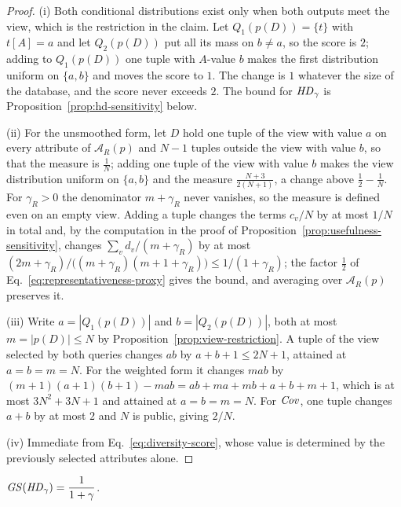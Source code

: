 \begin{proof}
(i) Both conditional distributions exist only when both outputs meet the view, which is the restriction in the claim.
Let $Q_1(p(D))=\{t\}$ with $t[A]=a$ and let $Q_2(p(D))$ put all its mass on $b\neq a$, so the score is $2$; adding to $Q_1(p(D))$ one tuple with $A$-value $b$ makes the first distribution uniform on $\{a,b\}$ and moves the score to $1$.
The change is $1$ whatever the size of the database, and the score never exceeds $2$.
The bound for $\mathit{HD}_\gamma$ is Proposition~\ref{prop:hd-sensitivity} below.

(ii) For the unsmoothed form, let $D$ hold one tuple of the view with value $a$ on every attribute of $\mathcal{A}_R(p)$ and $N-1$ tuples outside the view with value $b$, so that the measure is $\tfrac1N$; adding one tuple of the view with value $b$ makes the view distribution uniform on $\{a,b\}$ and the measure $\tfrac{N+3}{2(N+1)}$, a change above $\tfrac12-\tfrac1N$.
For $\gamma_R>0$ the denominator $m+\gamma_R$ never vanishes, so the measure is defined even on an empty view.
Adding a tuple changes the terms $c_v/N$ by at most $1/N$ in total and, by the computation in the proof of Proposition~\ref{prop:usefulness-sensitivity}, changes $\sum_v d_v/(m+\gamma_R)$ by at most $(2m+\gamma_R)/\big((m+\gamma_R)(m+1+\gamma_R)\big)\le1/(1+\gamma_R)$; the factor $\tfrac12$ of Eq.~\eqref{eq:representativeness-proxy} gives the bound, and averaging over $\mathcal{A}_R(p)$ preserves it.

(iii) Write $a=|Q_1(p(D))|$ and $b=|Q_2(p(D))|$, both at most $m=|p(D)|\le N$ by Proposition~\ref{prop:view-restriction}.
A tuple of the view selected by both queries changes $ab$ by $a+b+1\le2N+1$, attained at $a=b=m=N$. For the weighted form it changes $mab$ by $(m+1)(a+1)(b+1)-mab=ab+ma+mb+a+b+m+1$, which is at most $3N^2+3N+1$ and attained at $a=b=m=N$.
For $\mathit{Cov}$, one tuple changes $a+b$ by at most $2$ and $N$ is public, giving $2/N$.

(iv) Immediate from Eq.~\eqref{eq:diversity-score}, whose value is determined by the previously selected attributes alone.
\end{proof}


\begin{proposition}
\label{prop:hd-sensitivity}
$\mathit{GS}(\mathit{HD}_\gamma)=\dfrac{1}{1+\gamma}$.
\end{proposition}

